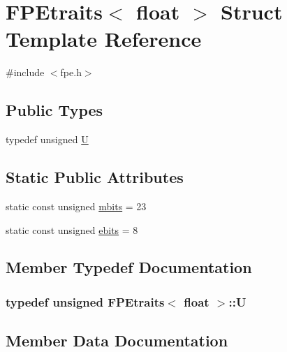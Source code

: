 \hypertarget{struct_f_p_etraits_3_01float_01_4}{}\section{F\+P\+Etraits$<$ float $>$ Struct Template Reference}
\label{struct_f_p_etraits_3_01float_01_4}


{\ttfamily \#include $<$fpe.\+h$>$}

\subsection*{Public Types}
\begin{DoxyCompactItemize}
\item 
typedef unsigned \hyperlink{struct_f_p_etraits_3_01float_01_4_a4d451fa553d0cefdf7d7ab35dcbfd82b}{U}
\end{DoxyCompactItemize}
\subsection*{Static Public Attributes}
\begin{DoxyCompactItemize}
\item 
static const unsigned \hyperlink{struct_f_p_etraits_3_01float_01_4_aabf457052178b75cbd63b00e0f9f0637}{mbits} = 23
\item 
static const unsigned \hyperlink{struct_f_p_etraits_3_01float_01_4_a33fe9667fe0d300a9a7ae9431af044ea}{ebits} = 8
\end{DoxyCompactItemize}


\subsection{Member Typedef Documentation}
\hypertarget{struct_f_p_etraits_3_01float_01_4_a4d451fa553d0cefdf7d7ab35dcbfd82b}{}
\subsubsection[{U}]{\setlength{\rightskip}{0pt plus 5cm}typedef unsigned {\bf F\+P\+Etraits}$<$ float $>$\+::{\bf U}}\label{struct_f_p_etraits_3_01float_01_4_a4d451fa553d0cefdf7d7ab35dcbfd82b}


\subsection{Member Data Documentation}
\hypertarget{struct_f_p_etraits_3_01float_01_4_a33fe9667fe0d300a9a7ae9431af044ea}{}
